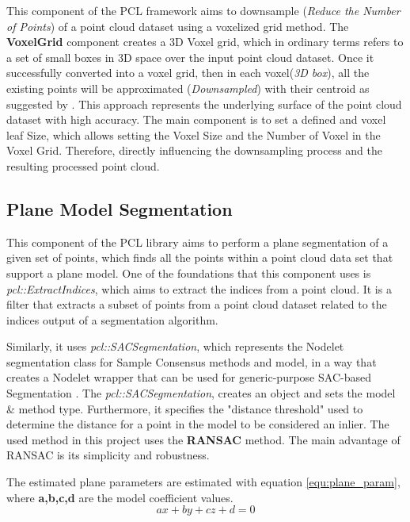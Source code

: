 \documentclass[12pt]{report}
\begin{document}
This component of the PCL  framework aims to downsample (\textit{Reduce the Number of Points}) of a point cloud dataset using a voxelized grid method.
The \textbf{VoxelGrid} component creates a 3D Voxel grid, which in ordinary terms refers to a set of small boxes in 3D space over the input point cloud dataset. 
Once it successfully converted into a voxel grid, then in each voxel(\textit{3D box}), all the existing points will be approximated (\textit{Downsampled}) with their centroid as suggested by .
This approach represents the underlying surface of the point cloud dataset with high accuracy.
The main component is to set a defined and voxel leaf Size, which allows setting the Voxel Size and the Number of Voxel in the Voxel Grid. Therefore, directly influencing the downsampling process and the resulting processed point cloud.





\subsection{Plane Model Segmentation}
\label{section:Plane Model Segmentation}
This component of the PCL library aims to perform a plane segmentation of a given set of points, which finds all the points within a point cloud data set that support a plane model.
One of the foundations that this component uses is \textit{pcl::ExtractIndices}, which aims to extract the indices from a point cloud.
It is a filter that extracts a subset of points from a point cloud dataset related to the indices output of a segmentation algorithm.

Similarly, it uses \textit{pcl::SACSegmentation}, which represents the Nodelet segmentation class for Sample Consensus methods and model, in a way that creates a Nodelet wrapper that can be used
for generic-purpose SAC-based Segmentation .
The \textit{pcl::SACSegmentation}, creates an object and sets the model \& method type. Furthermore, it specifies the "distance threshold" used to determine the distance for a point in the model to be considered an inlier.
The used method in this project uses the \textbf{RANSAC} method. The main advantage of RANSAC is its simplicity and robustness. 

The estimated plane parameters are estimated with equation \ref{equ:plane_param}, where \textbf{a,b,c,d} are the model coefficient values.
\begin{equation}
  ax + by + cz + d = 0
\label{equ:plane_param}
\end{equation}
\end{document}
